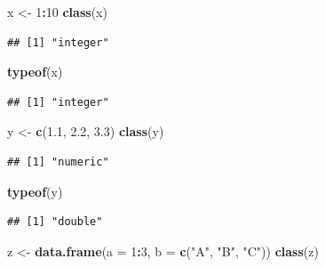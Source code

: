 \documentclass[
]{book}
\newenvironment{Shaded}{\begin{snugshade}}{\end{snugshade}}
\newcommand{\AttributeTok}[1]{\textcolor[rgb]{0.13,0.29,0.53}{#1}}
\newcommand{\DecValTok}[1]{\textcolor[rgb]{0.00,0.00,0.81}{#1}}
\newcommand{\FloatTok}[1]{\textcolor[rgb]{0.00,0.00,0.81}{#1}}
\newcommand{\FunctionTok}[1]{\textcolor[rgb]{0.13,0.29,0.53}{\textbf{#1}}}
\newcommand{\NormalTok}[1]{#1}
\newcommand{\OtherTok}[1]{\textcolor[rgb]{0.56,0.35,0.01}{#1}}
\newcommand{\SpecialCharTok}[1]{\textcolor[rgb]{0.81,0.36,0.00}{\textbf{#1}}}
\newcommand{\StringTok}[1]{\textcolor[rgb]{0.31,0.60,0.02}{#1}}
\theoremstyle{definition}
\theoremstyle{definition}
\theoremstyle{definition}
\theoremstyle{definition}
\theoremstyle{remark}
\begin{document}
\begin{Shaded}
\begin{Highlighting}[]
\NormalTok{x }\OtherTok{\textless{}{-}} \DecValTok{1}\SpecialCharTok{:}\DecValTok{10}
\FunctionTok{class}\NormalTok{(x) }
\end{Highlighting}
\end{Shaded}

\begin{verbatim}
## [1] "integer"
\end{verbatim}

\begin{Shaded}
\begin{Highlighting}[]
\FunctionTok{typeof}\NormalTok{(x) }
\end{Highlighting}
\end{Shaded}

\begin{verbatim}
## [1] "integer"
\end{verbatim}

\begin{Shaded}
\begin{Highlighting}[]
\NormalTok{y }\OtherTok{\textless{}{-}} \FunctionTok{c}\NormalTok{(}\FloatTok{1.1}\NormalTok{, }\FloatTok{2.2}\NormalTok{, }\FloatTok{3.3}\NormalTok{)}
\FunctionTok{class}\NormalTok{(y) }
\end{Highlighting}
\end{Shaded}

\begin{verbatim}
## [1] "numeric"
\end{verbatim}

\begin{Shaded}
\begin{Highlighting}[]
\FunctionTok{typeof}\NormalTok{(y) }
\end{Highlighting}
\end{Shaded}

\begin{verbatim}
## [1] "double"
\end{verbatim}

\begin{Shaded}
\begin{Highlighting}[]
\NormalTok{z }\OtherTok{\textless{}{-}} \FunctionTok{data.frame}\NormalTok{(}\AttributeTok{a =} \DecValTok{1}\SpecialCharTok{:}\DecValTok{3}\NormalTok{, }\AttributeTok{b =} \FunctionTok{c}\NormalTok{(}\StringTok{"A"}\NormalTok{, }\StringTok{"B"}\NormalTok{, }\StringTok{"C"}\NormalTok{))}
\FunctionTok{class}\NormalTok{(z) }
\end{Highlighting}
\end{Shaded}
\end{document}
